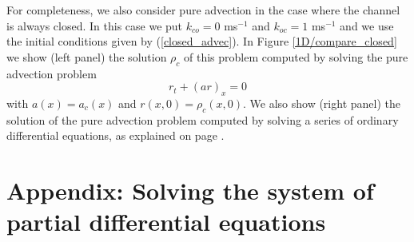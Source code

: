 
For completeness, we also consider pure advection in the case where 
the channel is always closed. In this case we put $k_{co}=0$ ms$^{-1}$ and $k_{oc}=1$ ms$^{-1}$
and we use the initial conditions given by (\ref{closed_advec}). In Figure 
\ref{1D/compare_closed} we show
(left panel) the solution $\rho_{c}$ of this problem computed by solving the
pure advection problem%
\begin{equation}
r_{t}+\left(  ar\right)  _{x}=0
\end{equation}
with $a(x)=a_{c}(x)$ and $r(x,0)=\rho_{c}(x,0).$ We also show (right
panel) the solution of the pure advection problem computed by solving a series
of ordinary differential equations, as explained on page \pageref{closed_advec}.





\section[Appendix]{Appendix: Solving the system of partial differential
equations \label{appendix_hyp}}

